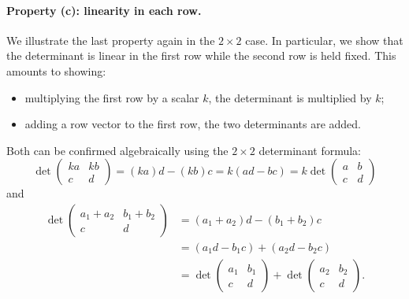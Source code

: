 \documentclass{ximera}
\begin{document}
\paragraph{Property (c): linearity in each row.}
We illustrate the last property again in the $2 \times 2$ case. In
particular, we show that the determinant is linear in the first row
while the second row is held fixed. This amounts to showing:
\begin{itemize}
\item multiplying the first row by a scalar $k$, the determinant is
  multiplied by $k$;
\item adding a row vector to the first row, the two determinants are added.
\end{itemize}

Both can be confirmed algebraically using the $2 \times 2$ determinant
formula:
\[
  \det
  \begin{pmatrix}
    k a & k b \\
    c & d
  \end{pmatrix}
  = (k a)d - (k b)c
  = k (ad - bc)
  = k \det
  \begin{pmatrix}
    a & b \\
    c & d
  \end{pmatrix}
\]
and
\begin{align*}
  \det
  \begin{pmatrix}
    a_1 + a_2 & b_1 + b_2 \\
    c & d
  \end{pmatrix}
  & = (a_1 + a_2) d - (b_1 + b_2) c \\
              & = (a_1 d - b_1 c) + (a_2 d - b_2 c) \\
              & = \det
                \begin{pmatrix}
                  a_1 & b_1 \\
                  c & d
                \end{pmatrix}
                + \det
                \begin{pmatrix}
                  a_2 & b_2 \\
                  c & d
                \end{pmatrix}.
\end{align*}
\end{document}

